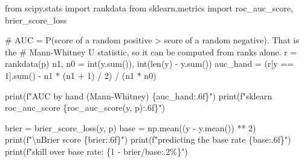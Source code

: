\documentclass[
  letterpaper,
  10pt,
  twoside,
  openright,
  numbers=noenddot,
  chapterprefix=true]{scrbook}
\newenvironment{Shaded}{}{}
\newcommand{\BuiltInTok}[1]{\textcolor[rgb]{0.84,0.23,0.29}{#1}}
\newcommand{\CharTok}[1]{\textcolor[rgb]{0.01,0.18,0.38}{#1}}
\newcommand{\CommentTok}[1]{\textcolor[rgb]{0.42,0.45,0.49}{#1}}
\newcommand{\DecValTok}[1]{\textcolor[rgb]{0.00,0.36,0.77}{#1}}
\newcommand{\ImportTok}[1]{\textcolor[rgb]{0.01,0.18,0.38}{#1}}
\newcommand{\NormalTok}[1]{\textcolor[rgb]{0.14,0.16,0.18}{#1}}
\newcommand{\OperatorTok}[1]{\textcolor[rgb]{0.14,0.16,0.18}{#1}}
\newcommand{\SpecialCharTok}[1]{\textcolor[rgb]{0.00,0.36,0.77}{#1}}
\newcommand{\SpecialStringTok}[1]{\textcolor[rgb]{0.01,0.18,0.38}{#1}}
\begin{document}
\label{check-auc}
\begin{Shaded}
\begin{Highlighting}[]
\ImportTok{from}\NormalTok{ scipy.stats }\ImportTok{import}\NormalTok{ rankdata}
\ImportTok{from}\NormalTok{ sklearn.metrics }\ImportTok{import}\NormalTok{ roc\_auc\_score, brier\_score\_loss}

\CommentTok{\# AUC = P(score of a random positive \textgreater{} score of a random negative). That is the}
\CommentTok{\# Mann{-}Whitney U statistic, so it can be computed from ranks alone.}
\NormalTok{r }\OperatorTok{=}\NormalTok{ rankdata(p)}
\NormalTok{n1, n0 }\OperatorTok{=} \BuiltInTok{int}\NormalTok{(y.}\BuiltInTok{sum}\NormalTok{()), }\BuiltInTok{int}\NormalTok{(}\BuiltInTok{len}\NormalTok{(y) }\OperatorTok{{-}}\NormalTok{ y.}\BuiltInTok{sum}\NormalTok{())}
\NormalTok{auc\_hand }\OperatorTok{=}\NormalTok{ (r[y }\OperatorTok{==} \DecValTok{1}\NormalTok{].}\BuiltInTok{sum}\NormalTok{() }\OperatorTok{{-}}\NormalTok{ n1 }\OperatorTok{*}\NormalTok{ (n1 }\OperatorTok{+} \DecValTok{1}\NormalTok{) }\OperatorTok{/} \DecValTok{2}\NormalTok{) }\OperatorTok{/}\NormalTok{ (n1 }\OperatorTok{*}\NormalTok{ n0)}

\BuiltInTok{print}\NormalTok{(}\SpecialStringTok{f"AUC by hand (Mann{-}Whitney)  }\SpecialCharTok{\{}\NormalTok{auc\_hand}\SpecialCharTok{:.6f\}}\SpecialStringTok{"}\NormalTok{)}
\BuiltInTok{print}\NormalTok{(}\SpecialStringTok{f"sklearn roc\_auc\_score       }\SpecialCharTok{\{}\NormalTok{roc\_auc\_score(y, p)}\SpecialCharTok{:.6f\}}\SpecialStringTok{"}\NormalTok{)}

\NormalTok{brier }\OperatorTok{=}\NormalTok{ brier\_score\_loss(y, p)}
\NormalTok{base }\OperatorTok{=}\NormalTok{ np.mean((y }\OperatorTok{{-}}\NormalTok{ y.mean()) }\OperatorTok{**} \DecValTok{2}\NormalTok{)}
\BuiltInTok{print}\NormalTok{(}\SpecialStringTok{f"}\CharTok{\textbackslash{}n}\SpecialStringTok{Brier score            }\SpecialCharTok{\{}\NormalTok{brier}\SpecialCharTok{:.6f\}}\SpecialStringTok{"}\NormalTok{)}
\BuiltInTok{print}\NormalTok{(}\SpecialStringTok{f"predicting the base rate }\SpecialCharTok{\{}\NormalTok{base}\SpecialCharTok{:.6f\}}\SpecialStringTok{"}\NormalTok{)}
\BuiltInTok{print}\NormalTok{(}\SpecialStringTok{f"skill over base rate:  }\SpecialCharTok{\{}\DecValTok{1} \OperatorTok{{-}}\NormalTok{ brier}\OperatorTok{/}\NormalTok{base}\SpecialCharTok{:.2\%\}}\SpecialStringTok{"}\NormalTok{)}
\end{Highlighting}
\end{Shaded}
\end{document}
